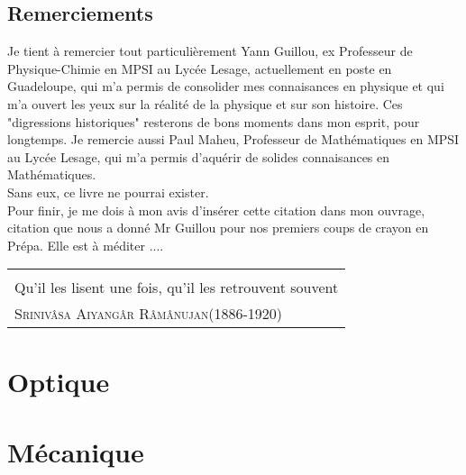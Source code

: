 \documentclass[a4paper, titlepage, draft,twoside]{book}
\begin{document}
\chapter{Remerciements}
Je tient à remercier tout particulièrement Yann Guillou, ex Professeur de Physique-Chimie en MPSI au Lycée Lesage, actuellement en poste en Guadeloupe, qui m'a permis de consolider mes connaisances en physique et qui m'a ouvert les yeux sur la réalité de la physique et sur son histoire. Ces "digressions historiques" resterons de bons moments dans mon esprit, pour longtemps. Je remercie aussi Paul Maheu, Professeur de Mathématiques en MPSI au Lycée Lesage, qui m'a permis d'aquérir de solides connaisances en Mathématiques.\\
Sans eux, ce livre ne pourrai exister.\\
Pour finir, je me dois à mon avis d'insérer cette citation dans mon ouvrage, citation que nous a donné Mr Guillou pour nos premiers coups de crayon en Prépa. Elle est à méditer ....
  \begin{flushright}
    \begin{tabular}{@{}p{6cm}@{}}
      {\raggedleft \itshape Je suis convaincu qu'il est plus bénéfique pour un étudiant de retrouver des démonstrations à partir de quelques indications que de les lire et de les relire ....\\
      Qu'il les lisent une fois, qu'il les retrouvent souvent\par}\\

   {\raggedleft \textsc{Srinivâsa Aiyangâr Râmânujan}(1886-1920)\par}

 \end{tabular}

\end{flushright}




\mainmatter                   %
\part{Optique}
\setcounter{chapter}{0}
\part{M\'ecanique}
    \setcounter{chapter}{0}
\end{document}
